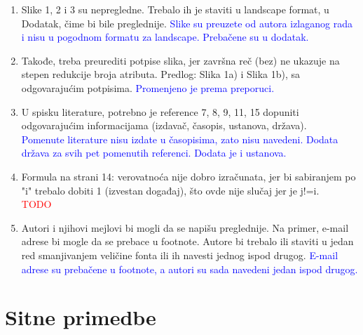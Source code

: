 \documentclass[a4paper]{report}
\newcommand{\odgovor}[1]{\textcolor{blue}{#1}}
\newcommand{\todo}[1]{\textcolor{red}{#1}}
\begin{document}
\begin{enumerate}
\item Slike 1, 2 i 3 su nepregledne.
Trebalo ih je staviti u landscape format, u Dodatak, čime bi bile preglednije.
\odgovor{Slike su preuzete od autora izlaganog rada i nisu u pogodnom formatu za landscape. Prebačene su u dodatak.}

\item Takođe, treba preurediti potpise slika,
jer završna reč (bez) ne ukazuje na stepen redukcije broja atributa.
Predlog:
Slika 1a) i Slika 1b), sa odgovarajućim potpisima.
\odgovor{Promenjeno je prema preporuci.}

\item U spisku literature, potrebno je reference 7, 8, 9, 11, 15
dopuniti odgovarajućim informacijama (izdavač, časopis, ustanova, država).
\\ \odgovor{Pomenute literature nisu izdate u časopisima, zato nisu navedeni. Dodata država za svih pet pomenutih referenci. Dodata je i ustanova. }

\item Formula na strani 14: verovatnoća nije dobro izračunata,
jer bi sabiranjem po "i" trebalo dobiti 1 (izvestan događaj), što ovde nije slučaj jer je j!=i.
\\\todo{TODO}

\item Autori i njihovi mejlovi bi mogli da se napišu preglednije.
Na primer, e-mail adrese bi mogle da se prebace u footnote.
Autore bi trebalo ili staviti u jedan red smanjivanjem veličine fonta
ili ih navesti jednog ispod drugog.
\odgovor{E-mail adrese su prebačene u footnote, a autori su sada navedeni jedan ispod drugog.}
\end{enumerate}

\section{Sitne primedbe}
\end{document}
